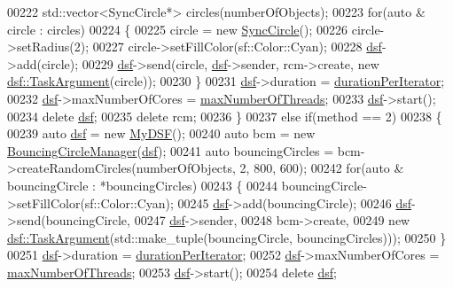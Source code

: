 \begin{DoxyCode}
00222         std::vector<SyncCircle*> circles(numberOfObjects);
00223         \textcolor{keywordflow}{for}(\textcolor{keyword}{auto} & circle : circles)
00224         \{
00225             circle = \textcolor{keyword}{new} \hyperlink{class_sync_circle}{SyncCircle}();
00226             circle->setRadius(2);
00227             circle->setFillColor(sf::Color::Cyan);
00228             \hyperlink{namespacedsf}{dsf}->add(circle);
00229             \hyperlink{namespacedsf}{dsf}->send(circle, \hyperlink{namespacedsf}{dsf}->sender, rcm->create, \textcolor{keyword}{new} 
      \hyperlink{classyc_1_1_any}{dsf::TaskArgument}(circle));
00230         \}
00231         \hyperlink{namespacedsf}{dsf}->duration = \hyperlink{main_8cpp_a05d9b1ebdb968e99b310a90811f1be91}{durationPerIterator};
00232         \hyperlink{namespacedsf}{dsf}->maxNumberOfCores = \hyperlink{main_8cpp_a4639134a7fa7033334111ff9d77316f3}{maxNumberOfThreads};
00233         \hyperlink{namespacedsf}{dsf}->start();
00234         \textcolor{keyword}{delete} \hyperlink{namespacedsf}{dsf};
00235         \textcolor{keyword}{delete} rcm;
00236     \}
00237     \textcolor{keywordflow}{else} \textcolor{keywordflow}{if}(method == 2)
00238     \{
00239         \textcolor{keyword}{auto} \hyperlink{namespacedsf}{dsf} = \textcolor{keyword}{new} \hyperlink{class_my_d_s_f}{MyDSF}();
00240         \textcolor{keyword}{auto} bcm = \textcolor{keyword}{new} \hyperlink{class_bouncing_circle_manager}{BouncingCircleManager}(\hyperlink{namespacedsf}{dsf});
00241         \textcolor{keyword}{auto} bouncingCircles = bcm->createRandomCircles(numberOfObjects, 2, 800, 600);
00242         \textcolor{keywordflow}{for}(\textcolor{keyword}{auto} & bouncingCircle : *bouncingCircles)
00243         \{
00244             bouncingCircle->setFillColor(sf::Color::Cyan);
00245             \hyperlink{namespacedsf}{dsf}->add(bouncingCircle);
00246             \hyperlink{namespacedsf}{dsf}->send(bouncingCircle,
00247                       \hyperlink{namespacedsf}{dsf}->sender,
00248                       bcm->create,
00249                       \textcolor{keyword}{new} \hyperlink{classyc_1_1_any}{dsf::TaskArgument}(std::make\_tuple(bouncingCircle, 
      bouncingCircles)));
00250         \}
00251         \hyperlink{namespacedsf}{dsf}->duration = \hyperlink{main_8cpp_a05d9b1ebdb968e99b310a90811f1be91}{durationPerIterator};
00252         \hyperlink{namespacedsf}{dsf}->maxNumberOfCores = \hyperlink{main_8cpp_a4639134a7fa7033334111ff9d77316f3}{maxNumberOfThreads};
00253         \hyperlink{namespacedsf}{dsf}->start();
00254         \textcolor{keyword}{delete} \hyperlink{namespacedsf}{dsf};

\end{DoxyCode}

